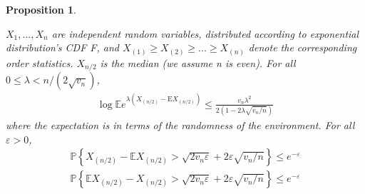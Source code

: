 \documentclass{article}
\theoremstyle{plain}
\newtheorem{prop}{Proposition}
\begin{document}
\begin{prop}
\label{prop 4.6}

$X_1, ..., X_n$ are independent random variables, distributed according to exponential distribution's CDF F, and $X_{(1)} \geq X_{(2)} \geq ... \geq X_{(n)}$ denote the corresponding order statistics. $X_{n/2}$ is the median (we assume n is even). For all $0 \leq \lambda<n /\left(2 \sqrt{v_{n}}\right)$, 
\begin{align}
    \log \mathbb{E}e^{\lambda\left(X_{(n / 2)}-\mathrm{E} X_{(n / 2)}\right)} \leq \frac{v_{n} \lambda^{2}}{2\left(1-2 \lambda \sqrt{v_{n} / n}\right)}
\end{align}
where the expectation is in terms of the randomness of the environment. For all $\varepsilon > 0$,
\begin{align} 
    \label{inequality Bernstein upper bound for exp}
    \mathbb{P}\left\{X_{(n / 2)}-\mathbb{E} X_{(n / 2)}>\sqrt{2 v_{n} \varepsilon}+2 \varepsilon \sqrt{v_{n} / n}\right\} \leq e^{-\varepsilon}\\
    \label{inequality Bernstein lower bound for exp}
    \mathbb{P}\left\{\mathbb{E} X_{(n / 2)} - X_{(n / 2)}>\sqrt{2 v_{n} \varepsilon}+2 \varepsilon \sqrt{v_{n} / n}\right\} \leq e^{-\varepsilon}
\end{align}
\end{prop}
\end{document}
